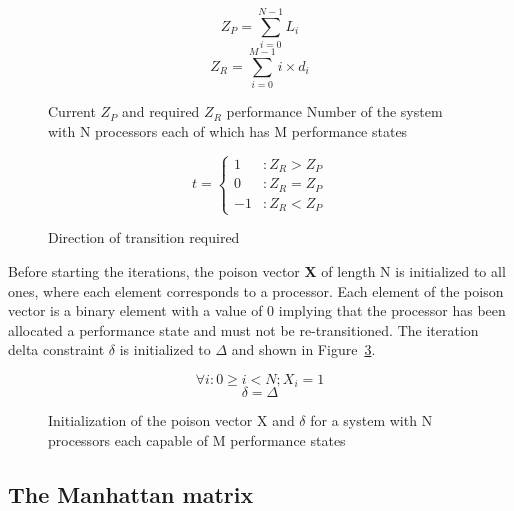 \begin{figure}[h!]
\centering
\begin{equation*}
    Z_{P} = \displaystyle\sum_{i=0}^{N-1} {L_{i}} 
\end{equation*}
\begin{equation*}
    Z_{R} = \displaystyle\sum_{i=0}^{M-1} {i \times d_{i}} 
\end{equation*}
\caption{Current $Z_{P}$ and required $Z_{R}$ performance Number of the system with N processors each of which has M performance states}
\label{fig:Z}
\end{figure}

\begin{figure}[h!]
\centering
\begin{equation*}
    t = \left\{
     \begin{array}{lr}
       1 & : Z_{R} > Z_{P}\\
       0 & : Z_{R} = Z_{P} \\
       -1 & : Z_{R} < Z_{P}
     \end{array}
   \right.
\end{equation*}
\caption{Direction of transition required}
\label{fig:transition_dir}
\end{figure}

Before starting the iterations, the poison vector \textbf{X} of length N is initialized to all ones, where
each element corresponds to a processor. Each element of the poison vector is a binary element with a value of 0 
implying that the processor has been allocated a performance state and must not be re-transitioned. 
The iteration delta constraint $\delta$ is initialized to $\Delta$ and shown in Figure~\ref{fig:init_X}.

\begin{figure}[h!]
\centering
\begin{equation*}
    \forall i : 0 \geq i < N; X_{i} = 1 
\end{equation*}
\begin{equation*}
    \delta = \Delta
\end{equation*}
\caption{Initialization of the poison vector X and $\delta$ for a system with N processors each capable of M performance states}
\label{fig:init_X}
\end{figure}

\subsection{The Manhattan matrix}~\label{sec:delta_matrix}

